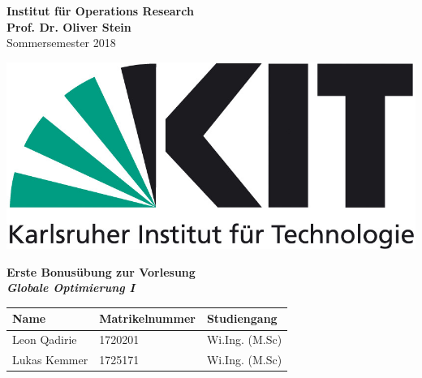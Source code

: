 \documentclass[ngerman, a4paper,12pt]{article}
\begin{document}
\begin{flushleft}
\vspace*{-100pt}
\textbf{Institut f\"ur Operations Research \\
Prof. Dr. Oliver Stein \\}
Sommersemester 2018
\vspace*{15pt}
\end{flushleft}

\begin{flushright}
\vspace*{-80pt}
\includegraphics[scale=0.5]{kit_logo}
\vspace*{15pt}
\end{flushright}

\begin{center}
\textbf{Erste Bonusübung zur Vorlesung \\
\emph{Globale Optimierung I}}        
\end{center}

\begin{table}[h]
	\centering
	\begin{tabularx}{\textwidth}{X X X}
		Name & Matrikelnummer & Studiengang \\
		\toprule
		Leon Qadirie					& 1720201 & Wi.Ing. (M.Sc)\\
		Lukas Kemmer 				& 1725171			& Wi.Ing. (M.Sc)\\
		\bottomrule
	\end{tabularx}

\end{table}
\end{document}
